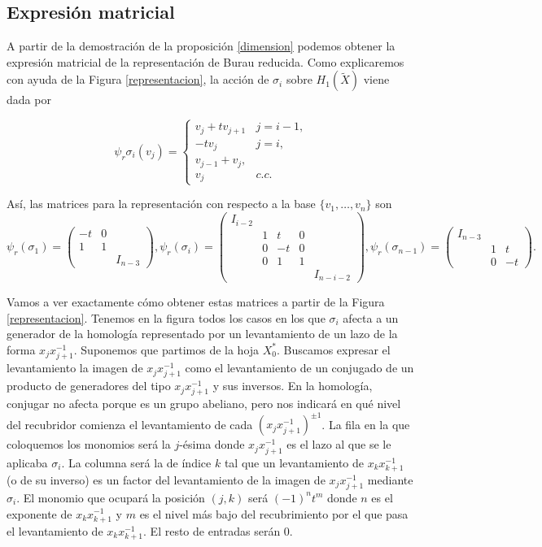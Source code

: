 \documentclass[TFG.tex]{subfiles}
\begin{document}
\subsection{Expresión matricial}
A partir de la demostración de la proposición \ref{dimension} podemos obtener la expresión matricial de la representación de Burau reducida. Como explicaremos con ayuda de la Figura \ref{representacion}, la acción de $\sigma_i$ sobre $H_1(\widetilde{X})$ viene dada por

\[
\psi_r\sigma_i(v_j)=\begin{cases}
v_j+tv_{j+1} & j=i-1,\\
-tv_j & j=i,\\
v_{j-1}+v_j,\\
v_j & c.c.
\end{cases}
\]

Así, las matrices para la representación con respecto a la base $\{v_1,\dots, v_n\}$ son
\[
\psi_r(\sigma_1)=\begin{pmatrix}
-t & 0 & \\
1 & 1 & \\
& & I_{n-3}
\end{pmatrix},\psi_r(\sigma_i )=\begin{pmatrix}
I_{i-2} & & &\\
& 1 & t & 0 & \\
& 0 & -t & 0 & \\
& 0 & 1 & 1 & \\
& & & & I_{n-i-2}  
\end{pmatrix}, \psi_r(\sigma_{n-1})=\begin{pmatrix}
I_{n-3} & &\\
& 1 & t \\
& 0 & -t 
\end{pmatrix}.
\]

Vamos a ver exactamente cómo obtener estas matrices a partir de la Figura \ref{representacion}. Tenemos en la figura todos los casos en los que $\sigma_i$ afecta a un generador de la homología representado por un levantamiento de un lazo de la forma $x_jx_{j+1}^{-1}$. Suponemos que partimos de la hoja $X^*_0$. Buscamos expresar el levantamiento la imagen de $x_jx_{j+1}^{-1}$ como el levantamiento de un conjugado de un producto de generadores del tipo $x_jx_{j+1}^{-1}$ y sus inversos. En la homología, conjugar no afecta porque es un grupo abeliano, pero nos indicará en qué nivel del recubridor comienza el levantamiento de cada $(x_jx_{j+1}^{-1})^{\pm 1}$. La fila en la que coloquemos los monomios será la $j$-ésima donde $x_jx_{j+1}^{-1}$ es el lazo al que se le aplicaba $\sigma_i$. La columna será la de índice $k$ tal que un levantamiento de $x_kx_{k+1}^{-1}$ (o de su inverso) es un factor del levantamiento de la imagen de $x_jx_{j+1}^{-1}$ mediante $\sigma_i$. El monomio que ocupará la posición $(j,k)$ será $(-1)^nt^m$ donde $n$ es el exponente de $x_kx_{k+1}^{-1}$ y $m$ es el nivel más bajo del recubrimiento por el que pasa el levantamiento de $x_kx_{k+1}^{-1}$. El resto de entradas serán 0.
\end{document}
